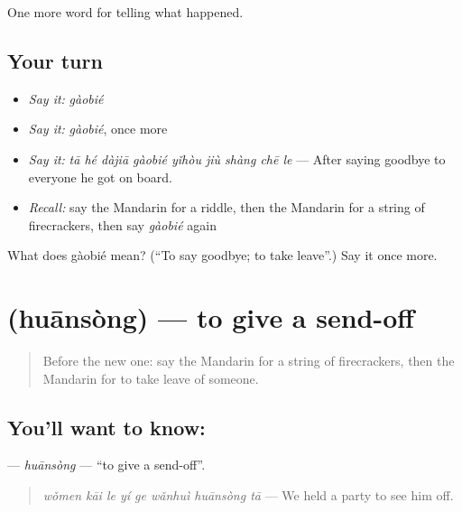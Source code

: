 \begin{grammarlens}[title={What you've built}]
One more word for telling what happened.
\end{grammarlens}

\subsection*{Your turn}
\begin{itemize}
\raggedright
  \item \emph{Say it:} \emph{gàobié}
  \item \emph{Say it:} \emph{gàobié}, once more
  \item \emph{Say it:} \emph{tā hé dàjiā gàobié yǐhòu jiù shàng chē le} — After saying goodbye to everyone he got on board.
  \item \emph{Recall:} say the Mandarin for a riddle, then the Mandarin for a string of firecrackers, then say \emph{gàobié} again
\end{itemize}

\begin{tcolorbox}[breakable,colback=teal!4,colframe=teal!35!black,title={Before you move on}]
What does gàobié mean? (\textquotedblleft{}To say goodbye; to take leave\textquotedblright{}.) Say it once more.
\end{tcolorbox}
\section[\texorpdfstring{\zh{欢送} (huānsòng)}{欢送 (huānsòng)}]{ (huānsòng) — to give a send-off}

\label{lesson:ZH-C336-huansong}



\begin{quote}
Before the new one: say the Mandarin for a string of firecrackers, then the Mandarin for to take leave of someone.
\end{quote}

\subsection*{You'll want to know: }
\textbf{} — \emph{huānsòng} — \textquotedblleft{}to give a send-off\textquotedblright{}.

\begin{quote}
\textbf{} \emph{wǒmen kāi le yí ge wǎnhuì huānsòng tā} — We held a party to see him off.
\end{quote}

